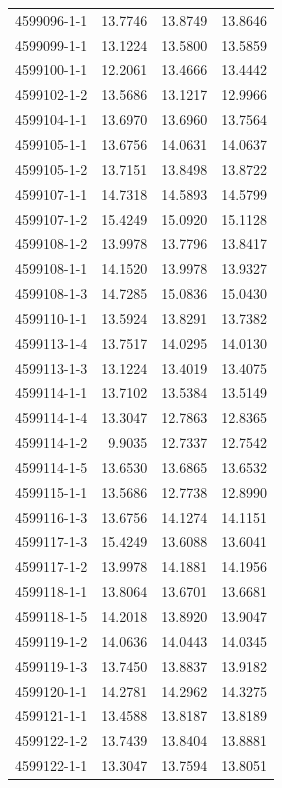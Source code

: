 \begin{longtable}{lrrr}
4599096-1-1 & 13.7746 & 13.8749 & 13.8646 \\
4599099-1-1 & 13.1224 & 13.5800 & 13.5859 \\
4599100-1-1 & 12.2061 & 13.4666 & 13.4442 \\
4599102-1-2 & 13.5686 & 13.1217 & 12.9966 \\
4599104-1-1 & 13.6970 & 13.6960 & 13.7564 \\
4599105-1-1 & 13.6756 & 14.0631 & 14.0637 \\
4599105-1-2 & 13.7151 & 13.8498 & 13.8722 \\
4599107-1-1 & 14.7318 & 14.5893 & 14.5799 \\
4599107-1-2 & 15.4249 & 15.0920 & 15.1128 \\
4599108-1-2 & 13.9978 & 13.7796 & 13.8417 \\
4599108-1-1 & 14.1520 & 13.9978 & 13.9327 \\
4599108-1-3 & 14.7285 & 15.0836 & 15.0430 \\
4599110-1-1 & 13.5924 & 13.8291 & 13.7382 \\
4599113-1-4 & 13.7517 & 14.0295 & 14.0130 \\
4599113-1-3 & 13.1224 & 13.4019 & 13.4075 \\
4599114-1-1 & 13.7102 & 13.5384 & 13.5149 \\
4599114-1-4 & 13.3047 & 12.7863 & 12.8365 \\
4599114-1-2 & 9.9035 & 12.7337 & 12.7542 \\
4599114-1-5 & 13.6530 & 13.6865 & 13.6532 \\
4599115-1-1 & 13.5686 & 12.7738 & 12.8990 \\
4599116-1-3 & 13.6756 & 14.1274 & 14.1151 \\
4599117-1-3 & 15.4249 & 13.6088 & 13.6041 \\
4599117-1-2 & 13.9978 & 14.1881 & 14.1956 \\
4599118-1-1 & 13.8064 & 13.6701 & 13.6681 \\
4599118-1-5 & 14.2018 & 13.8920 & 13.9047 \\
4599119-1-2 & 14.0636 & 14.0443 & 14.0345 \\
4599119-1-3 & 13.7450 & 13.8837 & 13.9182 \\
4599120-1-1 & 14.2781 & 14.2962 & 14.3275 \\
4599121-1-1 & 13.4588 & 13.8187 & 13.8189 \\
4599122-1-2 & 13.7439 & 13.8404 & 13.8881 \\
4599122-1-1 & 13.3047 & 13.7594 & 13.8051 \\

\end{longtable}

